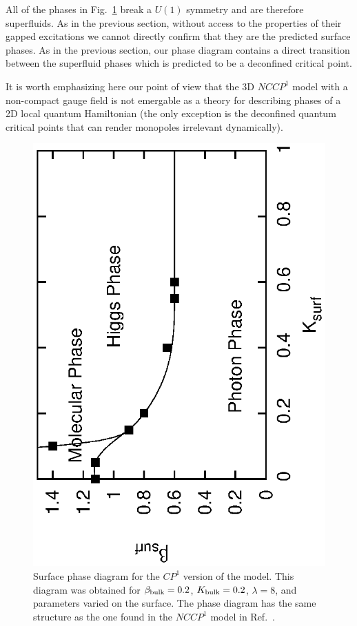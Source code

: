 \documentclass[prb,twocolumn]{revtex4-1}
\begin{document}
All of the phases in Fig.~\ref{cp1surfphase} break a $U(1)$ symmetry and are therefore superfluids. As in the previous section, without access to the properties of their gapped excitations we cannot directly confirm that they are the predicted surface phases. As in the previous section, our phase diagram contains a direct transition between the superfluid phases which is predicted to be a deconfined critical point.\cite{SenthilVishwanath}

It is worth emphasizing here our point of view that the 3D $NCCP^1$ model with a non-compact gauge field is not emergable as a theory for describing phases of a 2D local quantum Hamiltonian (the only exception is the deconfined quantum critical points that can render monopoles irrelevant dynamically). 

\begin{figure}
\includegraphics[angle=-90,width=0.9\linewidth]{figures/cp1surfphase.eps}
\caption{Surface phase diagram for the $CP^1$ version of the model. This diagram was obtained for $\beta_{\rm bulk}=0.2$, $K_{\rm bulk}=0.2$, $\lambda=8$, and parameters varied on the surface. The phase diagram has the same structure as the one found in the $NCCP^1$ model in Ref.~. }
\label{cp1surfphase}
\end{figure}
\end{document}

